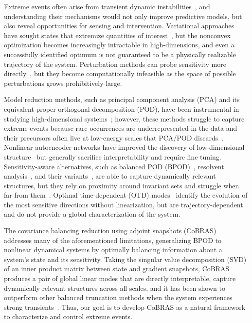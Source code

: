 \documentclass[twocolumn,10pt]{article}
\begin{document}
Extreme events often arise from transient dynamic instabilities~\cite{haller1995a, haller2010a, farazmand2016a, farazmand2016b}, and understanding their mechanisms would not only improve predictive models, but also reveal opportunities for sensing and intervention. Variational approaches have sought states that extremize quantities of interest~\cite{butler1992three, thompson1998initial, farazmand2017a}, but the nonconvex optimization becomes increasingly intractable in high-dimensions, and even a successfully identified optimum is not guaranteed to be a physically realizable trajectory of the system. Perturbation methods can probe sensitivity more directly~\cite{ansmann2013a}, but they become computationally infeasible as the space of possible perturbations grows prohibitively large.

Model reduction methods, such as principal component analysis (PCA) and its equivalent proper orthogonal decomposition (POD), have been instrumental in studying high-dimensional systems~\cite{lorenz1956empirical, berkooz1993proper}; however, these methods struggle to capture extreme events because rare occurrences are underrepresented in the data and their precursors often live at low-energy scales that PCA/POD discards~\cite{farazmand2019extreme}. Nonlinear autoencoder networks have improved the discovery of low-dimensional structure~\cite{fukami2023grasping} but generally sacrifice interpretability and require fine tuning. Sensitivity-aware alternatives, such as balanced POD (BPOD)~\cite{Willcox2002aiaaj, rowley2005model, ilak2008modeling}, resolvent analysis~\cite{mckeon2010critical, luhar2014opposition, herrmann2021data}, and their variants~\cite{benner2018mathcalh_2, benner2024balanced}, are able to capture dynamically relevant structures, but they rely on proximity around invariant sets and struggle when far from them~\cite{otto2022optimizing, otto2023model}. Optimal time-dependent (OTD) modes~\cite{babaee2016minimization, farazmand2016a,
babaee2017reduced, katsidoniotaki2026dynamics} identify the evolution of the most sensitive directions without linearization, but are trajectory-dependent and do not provide a global characterization of the system.

The covariance balancing reduction using adjoint snapshots (CoBRAS)~\cite{otto2023model} addresses many of the aforementioned limitations, generalizing BPOD to nonlinear dynamical systems by optimally balancing information about a system's state and its sensitivity. Taking the singular value decomposition (SVD) of an inner product matrix between state and gradient snapshots, CoBRAS produces a pair of global linear modes that are directly interpretable, capture dynamically relevant structures across all scales, and it has been shown to outperform other balanced truncation methods when the system experiences strong transients~\cite{otto2023model}. Thus, our goal is to develop CoBRAS as a natural framework to characterize and control extreme events.
\end{document}
